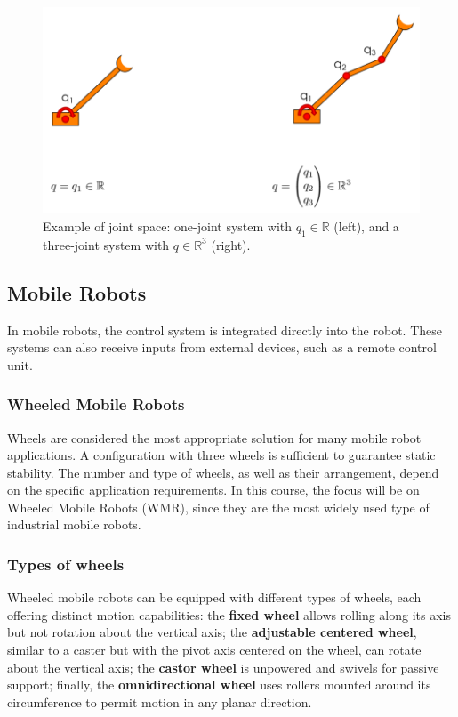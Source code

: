 \begin{figure}[H]
  \centering
  \includegraphics[width=0.9\linewidth]{imgs/joint_space_example.png}
  \caption{Example of joint space: one-joint system with $q_1 \in \mathbb{R}$ (left), and a three-joint system with $q \in \mathbb{R}^3$ (right).}
\end{figure}

\hfill

\subsection{Mobile Robots}

In mobile robots, the control system is integrated directly into the robot. These systems can also receive inputs from external devices, such as a remote control unit.

\subsubsection*{Wheeled Mobile Robots}

Wheels are considered the most appropriate solution for many mobile robot applications. A configuration with three wheels is sufficient to guarantee static stability. The number and type of wheels, as well as their arrangement, depend on the specific application requirements. In this course, the focus will be on Wheeled Mobile Robots (WMR), since they are the most widely used type of industrial mobile robots.

\subsubsection*{Types of wheels}

Wheeled mobile robots can be equipped with different types of wheels, each offering distinct motion capabilities: the \textbf{fixed wheel} allows rolling along its axis but not rotation about the vertical axis; the \textbf{adjustable centered wheel}, similar to a caster but with the pivot axis centered on the wheel, can rotate about the vertical axis; the \textbf{castor wheel} is unpowered and swivels for passive support; finally, the \textbf{omnidirectional wheel} uses rollers mounted around its circumference to permit motion in any planar direction.

